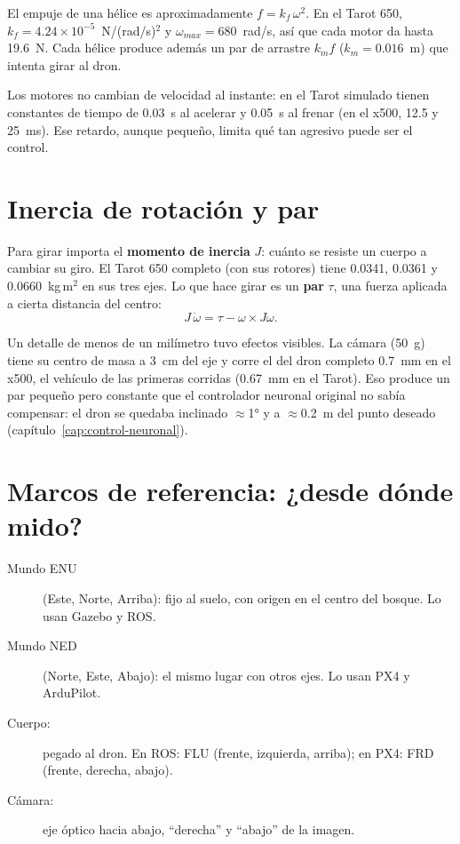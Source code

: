 El empuje de una hélice es aproximadamente $f = k_f\,\omega^2$. En el Tarot 650, $k_f = 4.24\times
10^{-5}$~N/(rad/s)$^2$ y $\omega_{max} = 680$~rad/s, así que cada motor da hasta 19.6~N. Cada hélice
produce además un par de arrastre $k_m f$ ($k_m = 0.016$~m) que intenta girar al dron.

\begin{recuerda}
Los motores no cambian de velocidad al instante: en el Tarot simulado tienen constantes de tiempo de
0.03~s al acelerar y 0.05~s al frenar (en el x500, 12.5 y 25~ms). Ese retardo, aunque pequeño, limita qué tan agresivo puede ser el control.
\end{recuerda}

\section{Inercia de rotación y par}

Para girar importa el \textbf{momento de inercia} $J$: cuánto se resiste un cuerpo a cambiar su giro.
El Tarot 650 completo (con sus rotores) tiene 0.0341, 0.0361 y 0.0660~kg\,m$^2$ en sus tres ejes. Lo que hace girar es un \textbf{par}
$\tau$, una fuerza aplicada a cierta distancia del centro:
\begin{equation}
J\,\dot\omega = \tau - \omega\times J\omega .
\end{equation}

\begin{leccion}
Un detalle de menos de un milímetro tuvo efectos visibles. La cámara (50~g) tiene su centro de masa a
3~cm del eje y corre el del dron completo 0.7~mm en el x500, el vehículo de las primeras corridas
(0.67~mm en el Tarot). Eso produce un par pequeño pero constante que el controlador
neuronal original no sabía compensar: el dron se quedaba inclinado $\approx$1° y a $\approx$0.2~m del
punto deseado (capítulo~\ref{cap:control-neuronal}).
\end{leccion}

\section{Marcos de referencia: ¿desde dónde mido?}

\begin{description}
  \item[Mundo ENU] (Este, Norte, Arriba): fijo al suelo, con origen en el centro del bosque. Lo usan
        Gazebo y ROS.
  \item[Mundo NED] (Norte, Este, Abajo): el mismo lugar con otros ejes. Lo usan PX4 y ArduPilot.
  \item[Cuerpo:] pegado al dron. En ROS: FLU (frente, izquierda, arriba); en PX4: FRD (frente,
        derecha, abajo).
  \item[Cámara:] eje óptico hacia abajo, ``derecha'' y ``abajo'' de la imagen.
\end{description}

